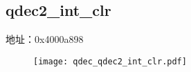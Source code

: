 \subsection{qdec2\_int\_clr}
\label{qdec-qdec2-int-clr}
地址：0x4000a898
 \begin{figure}[H]
\texttt{[image: qdec\_qdec2\_int\_clr.pdf]}
\end{figure}

